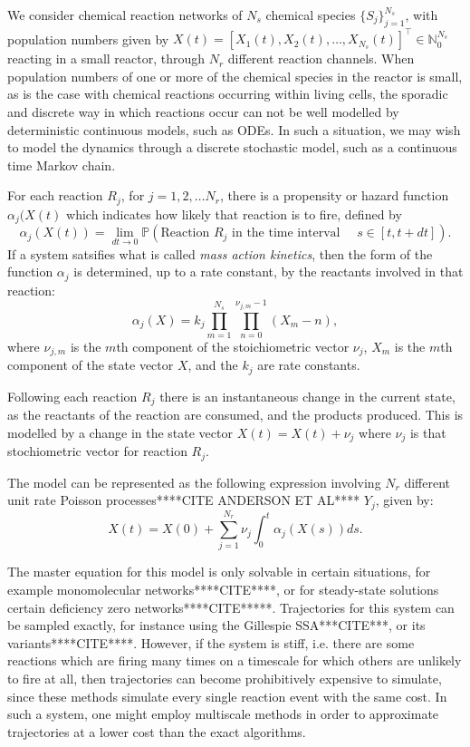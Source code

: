 \documentclass[final]{siamltex}
\begin{document}
We consider chemical reaction networks of $N_s$ chemical species $\{S_j\}_{j=1}^{N_s}$,
with population numbers given by $X(t) = [X_1(t), X_2(t), \ldots, X_{N_s}(t)]^\top \in
\mathbb{N}_0^{N_s}$ reacting in a small reactor, through $N_r$ different reaction
channels. When population numbers of one or more of the chemical
species in the reactor is small, as is the case with chemical
reactions occurring within living cells, the sporadic and discrete way
in which reactions occur can not be well modelled by deterministic
continuous models, such as ODEs. In such a situation, we may wish to
model the dynamics through a discrete stochastic model, such as a
continuous time Markov chain.

For each reaction $R_j$, for $j = 1,2,\ldots N_r$, there is a
propensity or hazard function $\alpha_j(X(t)$ which indicates how
likely that reaction is to fire, defined by
\[\alpha_j(X(t)) = \lim_{dt \to 0} \mathbb{P}(\text{Reaction $R_j$ in
    the time interval  } \quad s \in [t, t+ dt] ).\] If a system
satsifies what is called \emph{mass action kinetics}, then the form of
the function $\alpha_j$ is determined, up to a rate constant, by the
reactants involved in that reaction:
\begin{equation}\label{eq:MAK}
\alpha_j(X) = k_j \prod_{m=1}^{N_s} \prod_{n=0}^{\nu_{j,m} -1} (X_m - n),
\end{equation}
where $\nu_{j,m}$ is the $m$th component of the stoichiometric vector
$\nu_j$, $X_m$ is the $m$th component of the state vector $X$, and the
$k_j$ are rate constants.

Following each reaction $R_j$ there is an instantaneous change in the
current state, as the reactants of the reaction are consumed, and the
products produced. This is modelled by a change in the state vector
$X(t) = X(t) + \nu_j$ where $\nu_j$ is that stochiometric vector for
reaction $R_j$.

The model can be represented as the following expression involving
$N_r$ different unit rate Poisson
processes****CITE ANDERSON ET AL**** $Y_j$, given by:
\begin{equation}\label{eq:RTC}
X(t) = X(0) + \sum_{j=1}^{N_r} \nu_j \int_0^t \alpha_j(X(s)) ds.
\end{equation}

The master equation for this model is only solvable in certain
situations, for example monomolecular networks****CITE****, or for
steady-state solutions certain deficiency
zero networks****CITE*****. Trajectories for this system can be
sampled exactly, for instance using the Gillespie SSA***CITE***, or
its variants\cite{gillespie2007stochastic}****CITE****. However, if the system is stiff, i.e. there
are some reactions which are firing many times on a timescale for
which others are unlikely to fire at all, then trajectories can become
prohibitively expensive to simulate, since these methods simulate
every single reaction event with the same cost. In such a system, one
might employ multiscale methods in order to approximate trajectories
at a lower cost than the exact algorithms.
\end{document}
